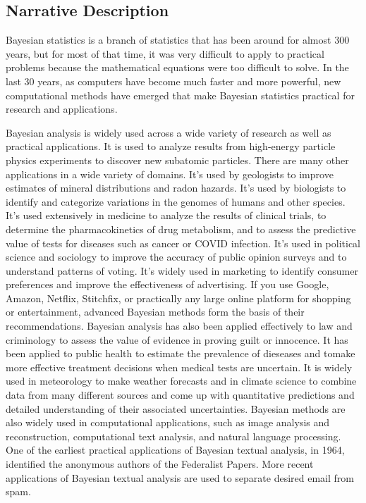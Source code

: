 \documentclass[11pt,twoside]{jgsyllabus}\usepackage[]{graphicx}\usepackage[]{xcolor}
\begin{document}
\subsection{Narrative Description}
Bayesian statistics is a branch of statistics that has been around for almost
300 years, but for most of that time, it was very difficult to apply to
practical problems because the mathematical equations were too difficult to
solve. In the last 30 years, as computers have become much faster and more
powerful, new computational methods have emerged that make Bayesian statistics
practical for research and applications.

Bayesian analysis is widely used across a wide variety of research as well as
practical applications. It is used to analyze results from high-energy
particle physics experiments to discover new subatomic particles.
There are many other applications in a wide variety of domains.
It's used by geologists to improve estimates of mineral distributions and
radon hazards.
It's used by biologists to identify and categorize variations in the genomes of
humans and other species.
It's used extensively in medicine to analyze the results of clinical trials,
to determine the pharmacokinetics of drug metabolism, and to assess the
predictive value of tests for diseases such as cancer or COVID infection.
It's used in political science and sociology to improve the
accuracy of public opinion surveys and to understand patterns of voting.
It's widely used in marketing to identify consumer preferences and
improve the effectiveness of advertising.
If you use Google, Amazon,
Netflix, Stitchfix, or practically any large online platform for shopping or
entertainment, advanced Bayesian methods form the basis of their
recommendations.
Bayesian analysis has also been applied effectively to law and criminology to
assess the value of evidence in proving guilt or innocence.
It has been applied to public health to estimate the prevalence of dieseases
and tomake more effective treatment decisions when medical tests are uncertain.
It is widely used in meteorology to make weather forecasts and in
climate science to combine data from many different sources and come up with
quantitative predictions and detailed understanding of their associated
uncertainties.
Bayesian methods are also widely used in computational applications, such as
image analysis and reconstruction, computational text analysis, and natural
language processing.
One of the earliest practical applications of Bayesian textual analysis,
in 1964, identified the anonymous authors of the Federalist Papers.
More recent applications of Bayesian textual analysis are used to separate
desired email from spam.
\end{document}
